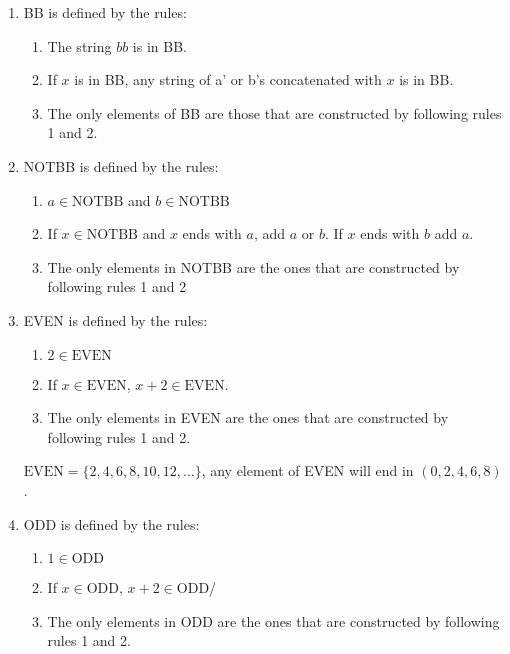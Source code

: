 \begin{solution}
    \begin{enumerate}[label=\alph*)]
        \item BB is defined by the rules:
        \begin{enumerate}[label=\arabic*]
            \item The string \(bb\) is in BB.
            \item If \(x\) is in BB, any string of a' or b's concatenated with \(x\) is in BB.
            \item The only elements of BB are those that are constructed by following rules 1 and 2.
        \end{enumerate}
        \item NOTBB is defined by the rules:
        \begin{enumerate}[label=\arabic*]
            \item \(a \in \text{NOTBB}\) and \(b \in \text{NOTBB}\)
            \item If \(x \in \text{NOTBB}\) and \(x\) ends with \(a\), add \(a\) or \(b\).
            If \(x\) ends with \(b\) add \(a\).
            \item The only elements in NOTBB are the ones that are constructed by following rules 1 and 2
        \end{enumerate}
        \item EVEN is defined by the rules:
        \begin{enumerate}[label=\arabic*]
            \item \(2 \in \text{EVEN}\)
            \item If \(x \in \text{EVEN}\), \(x+2 \in \text{EVEN}\).
            \item The only elements in EVEN are the ones that are constructed by following rules 1 and 2.
        \end{enumerate}
        \(\text{EVEN} = \{2,4,6,8,10,12,\ldots\}\), any element of EVEN will end in \((0,2,4,6,8)\).
        \item ODD is defined by the rules:
        \begin{enumerate}[label=\arabic*]
            \item \(1 \in \text{ODD}\)
            \item If \(x \in \text{ODD}\), \(x+2 \in \text{ODD}\)/
            \item The only elements in ODD are the ones that are constructed by following rules 1 and 2.
        \end{enumerate}

\end{enumerate}
\end{solution}
